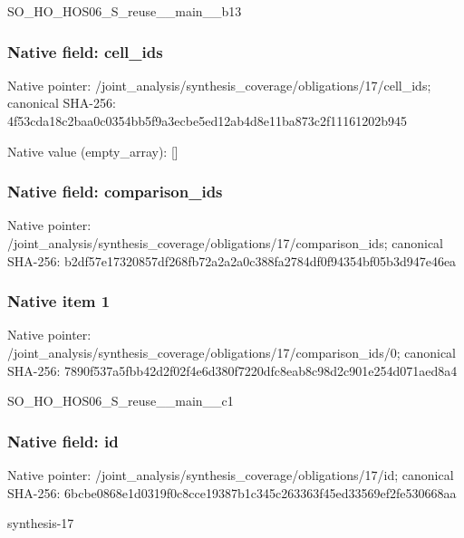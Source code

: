 \documentclass[10pt,a4paper]{article}
\begin{document}
\begingroup\raggedright\sloppy SO\_\allowbreak{}HO\_\allowbreak{}HOS06\_\allowbreak{}S\_\allowbreak{}reuse\_\allowbreak{}\_\allowbreak{}main\_\allowbreak{}\_\allowbreak{}b13\par\endgroup

\subsubsection{Native field: cell\_\allowbreak{}ids}
Native pointer: /joint\_\allowbreak{}analysis/synthesis\_\allowbreak{}coverage/obligations/17/cell\_\allowbreak{}ids; canonical SHA-256: 4f53cda18c2baa0c0354bb5f9a3ecbe5ed12ab4d8e11ba873c2f11161202b945

Native value (empty\_\allowbreak{}array): []

\subsubsection{Native field: comparison\_\allowbreak{}ids}
Native pointer: /joint\_\allowbreak{}analysis/synthesis\_\allowbreak{}coverage/obligations/17/comparison\_\allowbreak{}ids; canonical SHA-256: b2df57e17320857df268fb72a2a2a0c388fa2784df0f94354bf05b3d947e46ea

\subsubsection{Native item 1}
Native pointer: /joint\_\allowbreak{}analysis/synthesis\_\allowbreak{}coverage/obligations/17/comparison\_\allowbreak{}ids/0; canonical SHA-256: 7890f537a5fbb42d2f02f4e6d380f7220dfc8eab8c98d2c901e254d071aed8a4

\begingroup\raggedright\sloppy SO\_\allowbreak{}HO\_\allowbreak{}HOS06\_\allowbreak{}S\_\allowbreak{}reuse\_\allowbreak{}\_\allowbreak{}main\_\allowbreak{}\_\allowbreak{}c1\par\endgroup

\subsubsection{Native field: id}
Native pointer: /joint\_\allowbreak{}analysis/synthesis\_\allowbreak{}coverage/obligations/17/id; canonical SHA-256: 6bcbe0868e1d0319f0c8cce19387b1c345c263363f45ed33569ef2fe530668aa

\begingroup\raggedright\sloppy synthesis-17\par\endgroup
\end{document}
